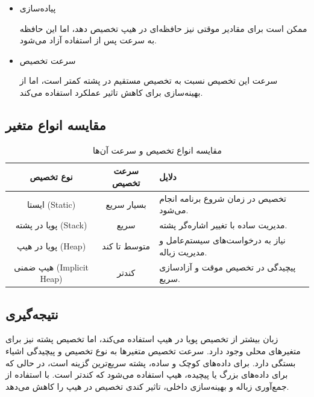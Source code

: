 \documentclass[11pt, a4paper, oneside]{book}
\begin{document}
					\begin{itemize}
						
						\item 
						{\large پیاده‌سازی}
						
						
						 ممکن است برای مقادیر موقتی نیز حافظه‌ای در هیپ تخصیص دهد، اما این حافظه به سرعت پس از استفاده آزاد می‌شود.
						
						
						\item 
						{\large سرعت تخصیص}
						
						
						سرعت این تخصیص نسبت به تخصیص مستقیم در پشته کمتر است، اما  از بهینه‌سازی برای کاهش تاثیر عملکرد استفاده می‌کند.
						
					\end{itemize}
				
			
			\subsection{مقایسه انواع متغیر}
				\begin{table}[h!]
					\centering
					\begin{tabular}{|c|c|p{5cm}|}
						\hline
						\textbf{نوع تخصیص} & \textbf{سرعت تخصیص} & \textbf{دلایل} \\ \hline
						ایستا (Static) & بسیار سریع & تخصیص در زمان شروع برنامه انجام می‌شود. \\ \hline
						پویا در پشته (Stack) & سریع & مدیریت ساده با تغییر اشاره‌گر پشته. \\ \hline
						پویا در هیپ (Heap) & متوسط تا کند & نیاز به درخواست‌های سیستم‌عامل و مدیریت زباله. \\ \hline
						هیپ ضمنی (Implicit Heap) & کندتر & پیچیدگی در تخصیص موقت و آزادسازی سریع. \\ \hline
					\end{tabular}
					\caption{مقایسه انواع تخصیص و سرعت آن‌ها}
					\label{table:allocation_speeds}
				\end{table}
				
				
			\subsection{نتیجه‌گیری}
				زبان  بیشتر از تخصیص پویا در هیپ استفاده می‌کند، اما تخصیص پشته نیز برای متغیرهای محلی وجود دارد. سرعت تخصیص متغیرها به نوع تخصیص و پیچیدگی اشیاء بستگی دارد. برای داده‌های کوچک و ساده، پشته سریع‌ترین گزینه است، در حالی که برای داده‌های بزرگ یا پیچیده، هیپ استفاده می‌شود که کندتر است.  با استفاده از جمع‌آوری زباله و بهینه‌سازی داخلی، تاثیر کندی تخصیص در هیپ را کاهش می‌دهد.
				
\end{document}
